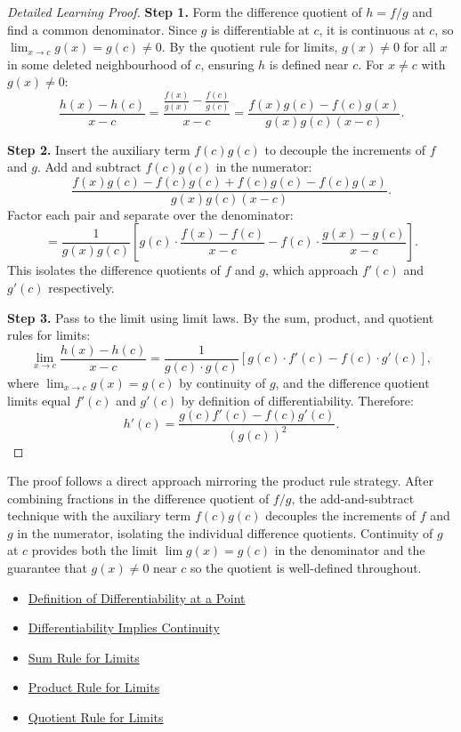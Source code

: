 \begin{proof}[Detailed Learning Proof]
\LRAProofBodyStart

\textbf{Step 1.} Form the difference quotient of $h = f/g$ and find a common denominator. Since $g$ is differentiable at $c$, it is continuous at $c$, so $\lim_{x \to c} g(x) = g(c) \neq 0$. By the quotient rule for limits, $g(x) \neq 0$ for all $x$ in some deleted neighbourhood of $c$, ensuring $h$ is defined near $c$. For $x \neq c$ with $g(x) \neq 0$:
\[
  \frac{h(x) - h(c)}{x - c}
  = \frac{\frac{f(x)}{g(x)} - \frac{f(c)}{g(c)}}{x - c}
  = \frac{f(x)g(c) - f(c)g(x)}{g(x)g(c)(x - c)}.
\]

\textbf{Step 2.} Insert the auxiliary term $f(c)g(c)$ to decouple the increments of $f$ and $g$. Add and subtract $f(c)g(c)$ in the numerator:
\[
  \frac{f(x)g(c) - f(c)g(c) + f(c)g(c) - f(c)g(x)}{g(x)g(c)(x - c)}.
\]
Factor each pair and separate over the denominator:
\[
  = \frac{1}{g(x)g(c)}
    \left[
      g(c) \cdot \frac{f(x) - f(c)}{x - c}
      - f(c) \cdot \frac{g(x) - g(c)}{x - c}
    \right].
\]
This isolates the difference quotients of $f$ and $g$, which approach $f'(c)$ and $g'(c)$ respectively.

\textbf{Step 3.} Pass to the limit using limit laws. By the sum, product, and quotient rules for limits:
\[
  \lim_{x \to c} \frac{h(x) - h(c)}{x - c}
  = \frac{1}{g(c) \cdot g(c)}
    \left[
      g(c) \cdot f'(c) - f(c) \cdot g'(c)
    \right],
\]
where $\lim_{x \to c} g(x) = g(c)$ by continuity of $g$, and the difference quotient limits equal $f'(c)$ and $g'(c)$ by definition of differentiability. Therefore:
\[
  h'(c) = \frac{g(c)f'(c) - f(c)g'(c)}{(g(c))^2}.
\]
\end{proof}

\begin{remark*}
The proof follows a direct approach mirroring the product rule strategy. After combining fractions in the difference quotient of $f/g$, the add-and-subtract technique with the auxiliary term $f(c)g(c)$ decouples the increments of $f$ and $g$ in the numerator, isolating the individual difference quotients. Continuity of $g$ at $c$ provides both the limit $\lim g(x) = g(c)$ in the denominator and the guarantee that $g(x) \neq 0$ near $c$ so the quotient is well-defined throughout.
\end{remark*}

\begin{dependencies}
\begin{itemize}
  \item \hyperref[def:derivative-at-a-point]{Definition of Differentiability at a Point}
  \item \hyperref[thm:differentiable-implies-continuous]{Differentiability Implies Continuity}
  \item \hyperref[thm:limit-sum]{Sum Rule for Limits}
  \item \hyperref[thm:limit-product]{Product Rule for Limits}
  \item \hyperref[thm:limit-quotient]{Quotient Rule for Limits}
\end{itemize}
\end{dependencies}

\clearpage

